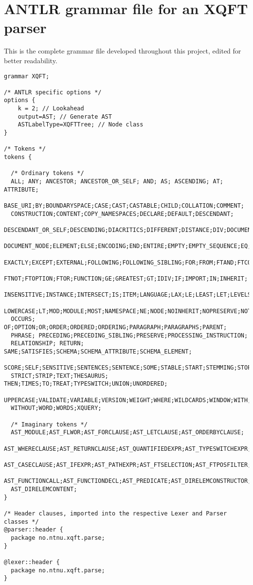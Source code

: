 \chapter{ANTLR grammar file for an XQFT parser }
This is the complete grammar file developed throughout this project, edited for
better readability.

\begin{Verbatim}[frame=none, fontsize=\footnotesize]
grammar XQFT;

/* ANTLR specific options */
options { 
    k = 2; // Lookahead
    output=AST; // Generate AST
    ASTLabelType=XQFTTree; // Node class
}

/* Tokens */
tokens {

  /* Ordinary tokens */
  ALL; ANY; ANCESTOR; ANCESTOR_OR_SELF; AND; AS; ASCENDING; AT; ATTRIBUTE; 
  BASE_URI;BY;BOUNDARYSPACE;CASE;CAST;CASTABLE;CHILD;COLLATION;COMMENT;
  CONSTRUCTION;CONTENT;COPY_NAMESPACES;DECLARE;DEFAULT;DESCENDANT;
  DESCENDANT_OR_SELF;DESCENDING;DIACRITICS;DIFFERENT;DISTANCE;DIV;DOCUMENT;
  DOCUMENT_NODE;ELEMENT;ELSE;ENCODING;END;ENTIRE;EMPTY;EMPTY_SEQUENCE;EQ;EVERY;
  EXACTLY;EXCEPT;EXTERNAL;FOLLOWING;FOLLOWING_SIBLING;FOR;FROM;FTAND;FTCONTAINS;
  FTNOT;FTOPTION;FTOR;FUNCTION;GE;GREATEST;GT;IDIV;IF;IMPORT;IN;INHERIT;
  INSENSITIVE;INSTANCE;INTERSECT;IS;ITEM;LANGUAGE;LAX;LE;LEAST;LET;LEVELS;
  LOWERCASE;LT;MOD;MODULE;MOST;NAMESPACE;NE;NODE;NOINHERIT;NOPRESERVE;NOT;
  OCCURS; OF;OPTION;OR;ORDER;ORDERED;ORDERING;PARAGRAPH;PARAGRAPHS;PARENT;
  PHRASE; PRECEDING;PRECEDING_SIBLING;PRESERVE;PROCESSING_INSTRUCTION;
  RELATIONSHIP; RETURN; SAME;SATISFIES;SCHEMA;SCHEMA_ATTRIBUTE;SCHEMA_ELEMENT;
  SCORE;SELF;SENSITIVE;SENTENCES;SENTENCE;SOME;STABLE;START;STEMMING;STOP;
  STRICT;STRIP;TEXT;THESAURUS; THEN;TIMES;TO;TREAT;TYPESWITCH;UNION;UNORDERED;
  UPPERCASE;VALIDATE;VARIABLE;VERSION;WEIGHT;WHERE;WILDCARDS;WINDOW;WITH;
  WITHOUT;WORD;WORDS;XQUERY;

  /* Imaginary tokens */
  AST_MODULE;AST_FLWOR;AST_FORCLAUSE;AST_LETCLAUSE;AST_ORDERBYCLAUSE;
  AST_WHERECLAUSE;AST_RETURNCLAUSE;AST_QUANTIFIEDEXPR;AST_TYPESWITCHEXPR;
  AST_CASECLAUSE;AST_IFEXPR;AST_PATHEXPR;AST_FTSELECTION;AST_FTPOSFILTER;
  AST_FUNCTIONCALL;AST_FUNCTIONDECL;AST_PREDICATE;AST_DIRELEMCONSTRUCTOR;
  AST_DIRELEMCONTENT;
}

/* Header clauses, imported into the respective Lexer and Parser classes */
@parser::header {
  package no.ntnu.xqft.parse;
}

@lexer::header {
  package no.ntnu.xqft.parse;  
}


\end{Verbatim}
